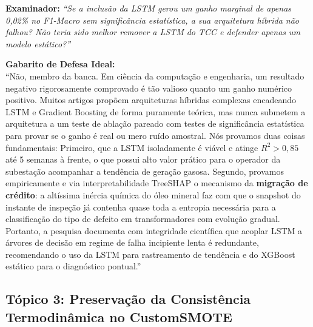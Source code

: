 \documentclass[10pt,a4paper]{article}
\begin{document}
\begin{alertbox}
\textbf{Examinador:} \textit{``Se a inclusão da LSTM gerou um ganho marginal de apenas 0,02\% no F1-Macro sem significância estatística, a sua arquitetura híbrida não falhou? Não teria sido melhor remover a LSTM do TCC e defender apenas um modelo estático?''}

\textbf{Gabarito de Defesa Ideal:}\\
``Não, membro da banca. Em ciência da computação e engenharia, um resultado negativo rigorosamente comprovado é tão valioso quanto um ganho numérico positivo.
Muitos artigos propõem arquiteturas híbridas complexas encadeando LSTM e Gradient Boosting de forma puramente teórica, mas nunca submetem a arquitetura a um teste de ablação pareado com testes de significância estatística para provar se o ganho é real ou mero ruído amostral.
Nós provamos duas coisas fundamentais:
Primeiro, que a LSTM isoladamente é viável e atinge $R^2 > 0,85$ até 5 semanas à frente, o que possui alto valor prático para o operador da subestação acompanhar a tendência de geração gasosa.
Segundo, provamos empiricamente e via interpretabilidade TreeSHAP o mecanismo da \textbf{migração de crédito}: a altíssima inércia química do óleo mineral faz com que o snapshot do instante de inspeção já contenha quase toda a entropia necessária para a classificação do tipo de defeito em transformadores com evolução gradual.
Portanto, a pesquisa documenta com integridade científica que acoplar LSTM a árvores de decisão em regime de falha incipiente lenta é redundante, recomendando o uso da LSTM para rastreamento de tendência e do XGBoost estático para o diagnóstico pontual.''
\end{alertbox}

\subsection{Tópico 3: Preservação da Consistência Termodinâmica no CustomSMOTE}
\end{document}
